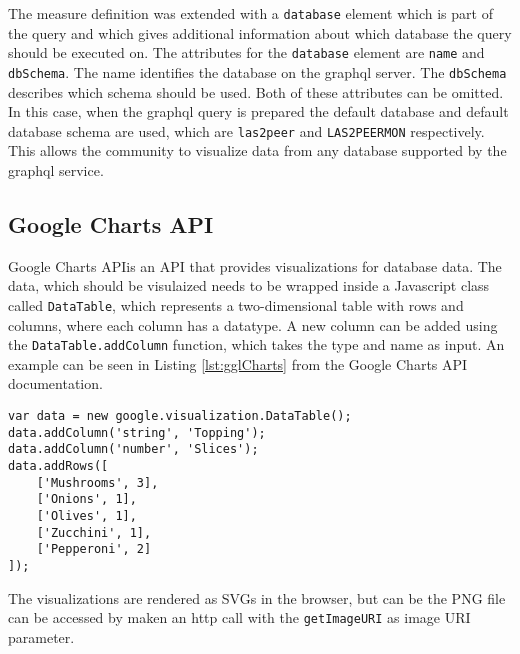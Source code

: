 The measure definition was extended with a \texttt{database} element which is part of the query and which gives additional information about which database the query should be executed on. The attributes for the \texttt{database} element are \texttt{name} and \texttt{dbSchema}. The name identifies the database on the graphql server. The \texttt{dbSchema} describes which schema should be used.
Both of these attributes can be omitted. In this case, when the graphql query is prepared the default database and default database schema are used, which are \texttt{las2peer} and \texttt{LAS2PEERMON} respectively.
This allows the community to visualize data from any database supported by the graphql service.

\subsection{Google Charts API}
Google Charts API\footnotemark is an API that provides visualizations for database data. The data, which should be visulaized needs to be wrapped inside a Javascript class called \texttt{DataTable}, which represents a two-dimensional table with rows and columns, where each column has a datatype.
A new column can be added using the \texttt{DataTable.addColumn} function, which takes the type and name as input. An example can be seen in Listing \ref{lst:gglCharts} from the Google Charts API documentation\footnotemark[\value{footnote}].

\begin{lstlisting}[caption=Example use of the DataTable class,captionpos=b,label={lst:gglCharts}]
var data = new google.visualization.DataTable();
data.addColumn('string', 'Topping');
data.addColumn('number', 'Slices');
data.addRows([
	['Mushrooms', 3],
	['Onions', 1],
	['Olives', 1], 
	['Zucchini', 1],
	['Pepperoni', 2]
]);
\end{lstlisting}

The visualizations are rendered as SVGs in the browser, but can be the PNG file can be accessed by maken an http call with the \texttt{getImageURI} as image URI parameter. 

